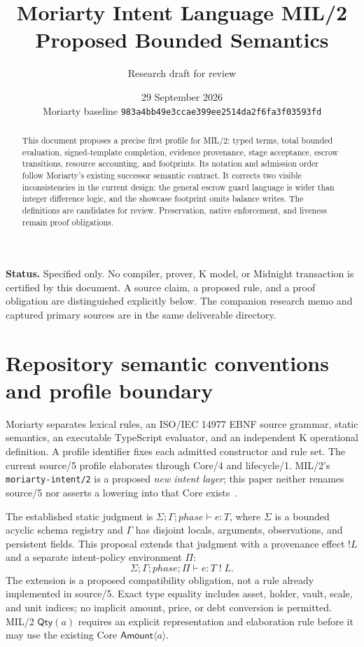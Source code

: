\documentclass[11pt,a4paper]{article}
\title{Moriarty Intent Language MIL/2\\Proposed Bounded Semantics}
\author{Research draft for review}
\date{29 September 2026\\\small Moriarty baseline \texttt{983a4bb49e3ccae399ee2514da2f6fa3f03593fd}}
\theoremstyle{definition}
\begin{document}
\maketitle
\begin{abstract}
This document proposes a precise first profile for MIL/2: typed terms, total bounded evaluation, signed-template completion, evidence provenance, stage acceptance, escrow transitions, resource accounting, and footprints. Its notation and admission order follow Moriarty's existing successor semantic contract. It corrects two visible inconsistencies in the current design: the general escrow guard language is wider than integer difference logic, and the showcase footprint omits balance writes. The definitions are candidates for review. Preservation, native enforcement, and liveness remain proof obligations.
\end{abstract}
\noindent\textbf{Status.} Specified only. No compiler, prover, K model, or Midnight transaction is certified by this document. A source claim, a proposed rule, and a proof obligation are distinguished explicitly below. The companion research memo and captured primary sources are in the same deliverable directory.

\section{Repository semantic conventions and profile boundary}
Moriarty separates lexical rules, an ISO/IEC 14977 EBNF source grammar, static semantics, an executable TypeScript evaluator, and an independent K operational definition. A profile identifier fixes each admitted constructor and rule set. The current source/5 profile elaborates through Core/4 and lifecycle/1. MIL/2's \texttt{moriarty-intent/2} is a proposed \emph{new intent layer}; this paper neither renames source/5 nor asserts a lowering into that Core exists~\cite{SRC5,STATIC,CORE}.

The established static judgment is $\Sigma;\Gamma;phase\vdash e:T$, where $\Sigma$ is a bounded acyclic schema registry and $\Gamma$ has disjoint locals, arguments, observations, and persistent fields. This proposal extends that judgment with a provenance effect $!L$ and a separate intent-policy environment $\Pi$:
\[
\Sigma;\Gamma;phase;\Pi\vdash e:T\;!\;L.
\tag{T}
\]
The extension is a proposed compatibility obligation, not a rule already implemented in source/5. Exact type equality includes asset, holder, vault, scale, and unit indices; no implicit amount, price, or debt conversion is permitted. MIL/2 $\mathsf{Qty}(a)$ requires an explicit representation and elaboration rule before it may use the existing Core $\mathsf{Amount}\langle a\rangle$.
\end{document}
